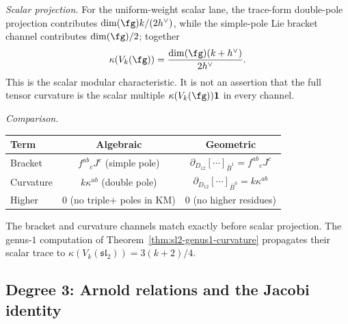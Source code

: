 \begin{computation}
\emph{Scalar projection.}
For the uniform-weight scalar lane, the trace-form double-pole
projection contributes $\dim(\fg)k/(2h^\vee)$, while the simple-pole
Lie bracket channel contributes $\dim(\fg)/2$; together
\[
\kappa(V_k(\fg))=\frac{\dim(\fg)(k+h^\vee)}{2h^\vee}.
\]
This is the scalar modular characteristic. It is not an assertion that
the full tensor curvature is the scalar multiple
$\kappa(V_k(\fg))\mathbf 1$ in every channel.

\emph{Comparison.}
\begin{center}
\renewcommand{\arraystretch}{1.2}
\begin{tabular}{lcc}
\textbf{Term} & \textbf{Algebraic} & \textbf{Geometric} \\
\hline
Bracket & ${f^{ab}}_c J^c$ (simple pole) &
 $\partial_{D_{12}}[\cdots]_{\bar B^1} = {f^{ab}}_c J^c$ \\
Curvature & $k\kappa^{ab}$ (double pole) &
 $\partial_{D_{12}}[\cdots]_{\bar B^0}=k\kappa^{ab}$ \\
Higher & $0$ (no triple+ poles in KM) &
 $0$ (no higher residues)
\end{tabular}
\end{center}
The bracket and curvature channels match exactly before scalar
projection. The genus-$1$ computation of
Theorem~\ref{thm:sl2-genus1-curvature} propagates their scalar trace to
$\kappa(V_k(\mathfrak{sl}_2))=3(k+2)/4$.
\end{computation}

\subsection{Degree 3: Arnold relations and the Jacobi identity}


